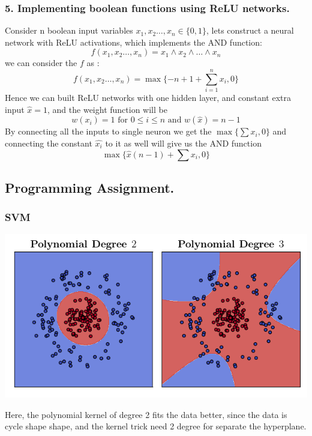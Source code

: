 \documentclass[12pt]{article}
\theoremstyle{plain}
\begin{document}
\subsubsection*{ 5.  Implementing boolean functions using ReLU networks. }
Consider n
boolean input variables $x_1,x_2\dots,x_n\in \{0,1\}$, lets construct a neural network
with ReLU activations, which implements the AND function:
\[f(x_1,x_2\dots,x_n)=x_1\wedge x_2\wedge\dots \wedge x_n
\] we can consider the $f$ as :
\[f(x_1,x_2\dots,x_n)=\max\{-n+1+\sum^n_{i=1} x_i,0\}
\]
Hence we can built ReLU networks with one hidden layer, and constant extra input $\hat{x}=1$, and the weight function will be 
\[  w(x_i)=1 \text{ for } 0\le i\le n \text{ and } w(\hat{x})=n-1
\]
By connecting all the inputs to single neuron we get the $\max \{\sum x_i,0\}$ and connecting  the constant $\hat{x_i}$ to it as well will give us the AND function $$\max \{\hat{x}(n-1)+\sum x_i,0\}$$
\pagebreak
\begin{center}
\subsection*{Programming Assignment. }
\subsubsection*{ SVM }
\end{center}
\noindent \begin{minipage}{0.5\textwidth}
\vspace{1cm}
\includegraphics[width=\textwidth]{plot 4.1.png}
\label{fig:1}
\end{minipage}
\hspace{0.05\textwidth}
\begin{minipage}{0.4\textwidth}
Here, the polynomial
kernel of degree 2 fits the data better, since the data is cycle shape shape, and the kernel trick need 2 degree for separate the hyperplane.
\end{minipage}
\end{document}
